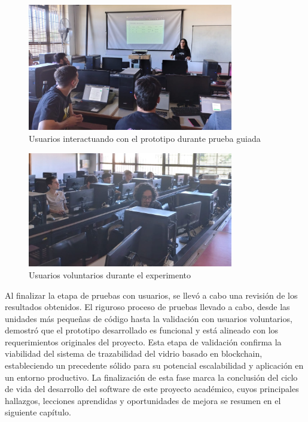 
\begin{figure}[!htb]
\centering
\includegraphics[width=0.8\textwidth]{Figures/uat-1.jpg}
\caption{Usuarios interactuando con el prototipo durante prueba guiada}
\label{fig:uat-picture-1}
\end{figure}

\begin{figure}[!htb]
\centering
\includegraphics[width=0.8\textwidth]{Figures/uat-2.jpg}
\caption{Usuarios voluntarios durante el experimento}
\label{fig:uat-picture-2}
\end{figure}

Al finalizar la etapa de pruebas con usuarios, se llevó a cabo una revisión de los resultados obtenidos. El riguroso proceso de pruebas llevado a cabo, desde las unidades más pequeñas de código hasta la validación con usuarios voluntarios, demostró que el prototipo desarrollado es funcional y está alineado con los requerimientos originales del proyecto. Esta etapa de validación confirma la viabilidad del sistema de trazabilidad del vidrio basado en blockchain, estableciendo un precedente sólido para su potencial escalabilidad y aplicación en un entorno productivo. La finalización de esta fase marca la conclusión del ciclo de vida del desarrollo del software de este proyecto académico, cuyos principales hallazgos, lecciones aprendidas y oportunidades de mejora se resumen en el siguiente capítulo.
